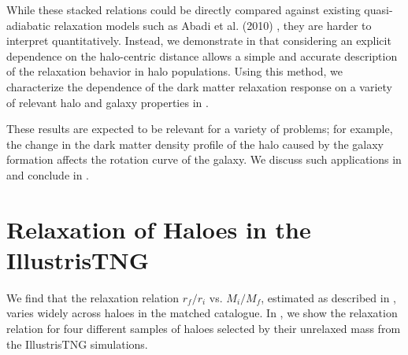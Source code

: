 While these stacked relations could be directly compared against existing quasi-adiabatic relaxation models such as Abadi et al. (2010) \citep{2010MNRAS.407..435A}, they are harder to interpret quantitatively. Instead, we demonstrate in  that considering an explicit dependence on the halo-centric distance allows a simple and accurate description of the relaxation behavior in halo populations. Using this method, we characterize the dependence of the dark matter relaxation response on a variety of relevant halo and galaxy properties in .

These results are expected to be relevant for a variety of problems; for example, the change in the dark matter density profile of the halo caused by the galaxy formation affects the rotation curve of the galaxy. We discuss such applications in  and conclude in . 







\section{Relaxation of Haloes in the IllustrisTNG}
\label{sec:results-1-ch:z0main}

We find that the relaxation relation $r_f/r_i$ vs. $M_i/M_f$, estimated as described in , varies widely across haloes in the matched catalogue. In , we show the relaxation relation for four different samples of haloes selected by their unrelaxed mass from the IllustrisTNG simulations. 


